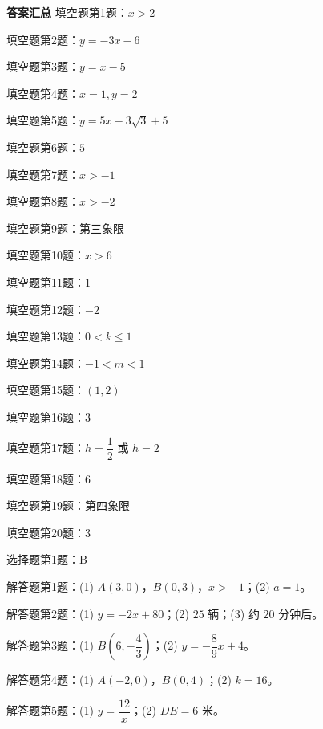 \documentclass{exam-zh}
\begin{document}
\begin{keyideabox}
  \textbf{答案汇总}
  填空题第1题：$x>2$

填空题第2题：$y=-3x-6$

填空题第3题：$y=x-5$

填空题第4题：$x=1,y=2$

填空题第5题：$y=5x-3\sqrt3+5$

填空题第6题：$5$

填空题第7题：$x>-1$

填空题第8题：$x>-2$

填空题第9题：第三象限

填空题第10题：$x>6$

填空题第11题：$1$

填空题第12题：$-2$

填空题第13题：$0<k\le1$

填空题第14题：$-1<m<1$

填空题第15题：$(1,2)$

填空题第16题：$3$

填空题第17题：$h=\dfrac12$ 或 $h=2$

填空题第18题：$6$

填空题第19题：第四象限

填空题第20题：$3$

选择题第1题：B

解答题第1题：(1) $A(3,0)$，$B(0,3)$，$x>-1$；(2) $a=1$。

解答题第2题：(1) $y=-2x+80$；(2) $25$ 辆；(3) 约 $20$ 分钟后。

解答题第3题：(1) $B(6,-\dfrac43)$；(2) $y=-\dfrac89x+4$。

解答题第4题：(1) $A(-2,0)$，$B(0,4)$；(2) $k=16$。

解答题第5题：(1) $y=\dfrac{12}{x}$；(2) $DE=6$ 米。
\end{keyideabox}
\end{document}

